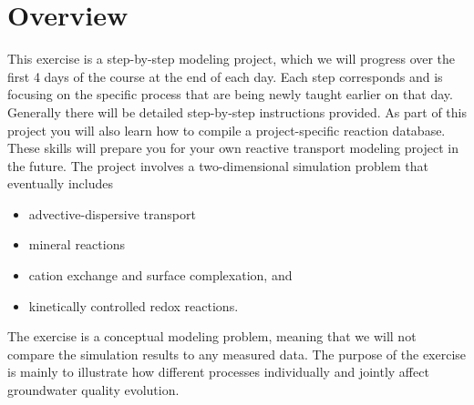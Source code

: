 \section[Overview]{Overview}
This exercise is a step-by-step modeling project, 
which we will progress over the first 4 days of the course at the end of each day.
Each step corresponds and is focusing on the specific process that are being
newly taught earlier on that day.      
Generally there will be detailed step-by-step instructions provided. 
As part of this project you will also learn how to compile a project-specific 
reaction database. These skills will prepare you for your own 
reactive transport modeling project in the future. The project involves 
a two-dimensional simulation problem that eventually includes

\begin{itemize} 
\item advective-dispersive transport 
\item mineral reactions 
\item cation exchange and surface complexation, and 
\item kinetically controlled redox reactions. 
\end{itemize} 

The exercise is a conceptual modeling problem, meaning that we will not compare the simulation 
results to any measured data. The purpose of the exercise is mainly to illustrate 
how different processes individually and jointly affect groundwater quality evolution.

